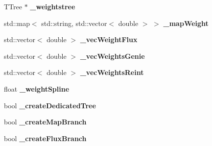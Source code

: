 \begin{DoxyCompactItemize}
\item 
T\+Tree $\ast$ {\bfseries \+\_\+weightstree}\hypertarget{classanalysis_1_1EventWeightTree_a007ac1f04819cff64bb54b6206966408}{}\label{classanalysis_1_1EventWeightTree_a007ac1f04819cff64bb54b6206966408}

\item 
std\+::map$<$ std\+::string, std\+::vector$<$ double $>$ $>$ {\bfseries \+\_\+map\+Weight}\hypertarget{classanalysis_1_1EventWeightTree_aef493db93e72288ef19cd155052fbce6}{}\label{classanalysis_1_1EventWeightTree_aef493db93e72288ef19cd155052fbce6}

\item 
std\+::vector$<$ double $>$ {\bfseries \+\_\+vec\+Weight\+Flux}\hypertarget{classanalysis_1_1EventWeightTree_a63fcb54ac96617bfa03f1c98bc941d47}{}\label{classanalysis_1_1EventWeightTree_a63fcb54ac96617bfa03f1c98bc941d47}

\item 
std\+::vector$<$ double $>$ {\bfseries \+\_\+vec\+Weights\+Genie}\hypertarget{classanalysis_1_1EventWeightTree_a27f4bcfa903da58796010d056b257f1c}{}\label{classanalysis_1_1EventWeightTree_a27f4bcfa903da58796010d056b257f1c}

\item 
std\+::vector$<$ double $>$ {\bfseries \+\_\+vec\+Weights\+Reint}\hypertarget{classanalysis_1_1EventWeightTree_a2afa517c5d3c82f395cca60f6bed1e55}{}\label{classanalysis_1_1EventWeightTree_a2afa517c5d3c82f395cca60f6bed1e55}

\item 
float {\bfseries \+\_\+weight\+Spline}\hypertarget{classanalysis_1_1EventWeightTree_a5f616b70e5653cd00a2beda1da0db13f}{}\label{classanalysis_1_1EventWeightTree_a5f616b70e5653cd00a2beda1da0db13f}

\item 
bool {\bfseries \+\_\+create\+Dedicated\+Tree}\hypertarget{classanalysis_1_1EventWeightTree_a2ae36b271ba94dcdfcaafd0d3d9f4550}{}\label{classanalysis_1_1EventWeightTree_a2ae36b271ba94dcdfcaafd0d3d9f4550}

\item 
bool {\bfseries \+\_\+create\+Map\+Branch}\hypertarget{classanalysis_1_1EventWeightTree_ac0eeccf0e01dde3c1d0e97674dcbfbb9}{}\label{classanalysis_1_1EventWeightTree_ac0eeccf0e01dde3c1d0e97674dcbfbb9}

\item 
bool {\bfseries \+\_\+create\+Flux\+Branch}\hypertarget{classanalysis_1_1EventWeightTree_a2905d3ca10c17a92cef96d00c9b65801}{}\label{classanalysis_1_1EventWeightTree_a2905d3ca10c17a92cef96d00c9b65801}


\end{DoxyCompactItemize}
